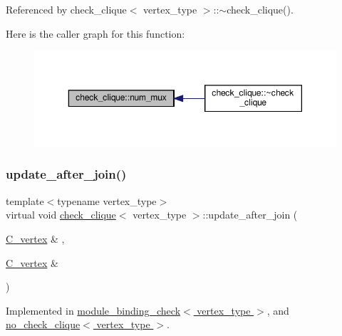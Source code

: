 Referenced by check\+\_\+clique$<$ vertex\+\_\+type $>$\+::$\sim$check\+\_\+clique().

Here is the caller graph for this function\+:
\nopagebreak
\begin{figure}[H]
\begin{center}
\leavevmode
\includegraphics[width=350pt]{d9/d11/structcheck__clique_af124519bb9bb0f5476b38a20b8a7303b_icgraph}
\end{center}
\end{figure}
\mbox{\label{structcheck__clique_a9b4bfcf91eab9a68e1b75371ce372515}} 
\subsubsection{\texorpdfstring{update\+\_\+after\+\_\+join()}{update\_after\_join()}}
{\footnotesize\ttfamily template$<$typename vertex\+\_\+type$>$ \\
virtual void \hyperlink{structcheck__clique}{check\+\_\+clique}$<$ vertex\+\_\+type $>$\+::update\+\_\+after\+\_\+join (\begin{DoxyParamCaption}\item[{\hyperlink{clique__covering__graph_8hpp_a9cb45047ea8c5ed95a8cfa90494345aa}{C\+\_\+vertex} \&}]{,  }\item[{\hyperlink{clique__covering__graph_8hpp_a9cb45047ea8c5ed95a8cfa90494345aa}{C\+\_\+vertex} \&}]{ }\end{DoxyParamCaption})\hspace{0.3cm}{\ttfamily [pure virtual]}}



Implemented in \hyperlink{structmodule__binding__check_ae76cbfa7bdfffd10adf7033c67224798}{module\+\_\+binding\+\_\+check$<$ vertex\+\_\+type $>$}, and \hyperlink{structno__check__clique_a471b7884a66663db6a478c3a80b47b48}{no\+\_\+check\+\_\+clique$<$ vertex\+\_\+type $>$}.



